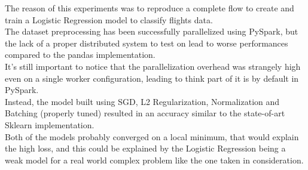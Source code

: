 \documentclass[
	letterpaper, %
	10pt, %
]{class}
\begin{document}
The reason of this experiments was to reproduce a complete flow to create and train a Logistic Regression model to classify flights data.\\
The dataset preprocessing has been successfully parallelized using PySpark, but the lack of a proper distributed system to test on lead to worse performances compared to the pandas implementation.\\
It's still important to notice that the parallelization overhead was strangely high even on a single worker configuration, leading to think part of it is by default in PySpark.\\
Instead, the model built using SGD, L2 Regularization, Normalization and Batching (properly tuned) resulted in an accuracy similar to the state-of-art Sklearn implementation.\\
Both of the models probably converged on a local minimum, that would explain the high loss, and this could be explained by the Logistic Regression being a weak model for a real world complex problem like the one taken in consideration.


\printbibliography %


\end{document}
